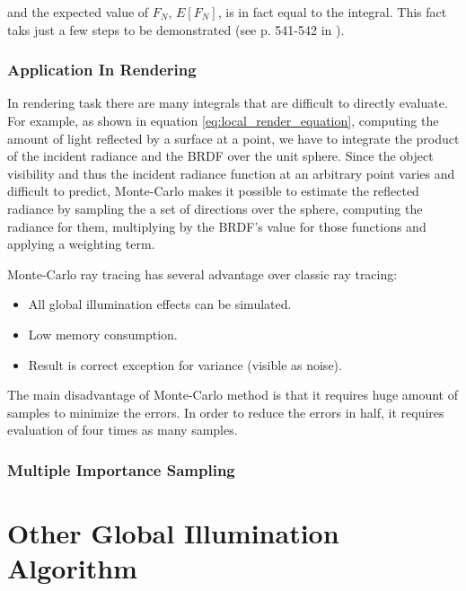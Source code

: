 and the expected value of \(F_{N}\), \(E[F_{N}]\), is in fact equal to the integral. This fact taks just a few steps to be demonstrated (see p. 541-542 in \cite{Pharr:2010:PBR:1854996}). 

\subsubsection{Application In Rendering} 
In rendering task there are many integrals that are difficult to directly evaluate. For example, as shown in equation \ref{eq:local_render_equation}, computing the amount of light reflected by a surface at a point, we have to integrate the product of the incident radiance and the BRDF over the unit sphere. Since the object visibility and thus the incident radiance function at an arbitrary point varies and difficult to predict, Monte-Carlo makes it possible to estimate the reflected radiance by sampling the a set of directions over the sphere, computing the radiance for them, multiplying by the BRDF's value for those functions and applying a weighting term. 

Monte-Carlo ray tracing has several advantage over classic ray tracing: 

\begin{itemize} 

\item All global illumination effects can be simulated.

\item Low memory consumption. 

\item Result is correct exception for variance (visible as noise). 

\end{itemize} 

The main disadvantage of Monte-Carlo method is that it requires huge amount of samples to minimize the errors. In order to reduce the errors in half, it requires evaluation of four times as many samples. 

\subsubsection{Multiple Importance Sampling} 


\section{Other Global Illumination Algorithm}  
 
